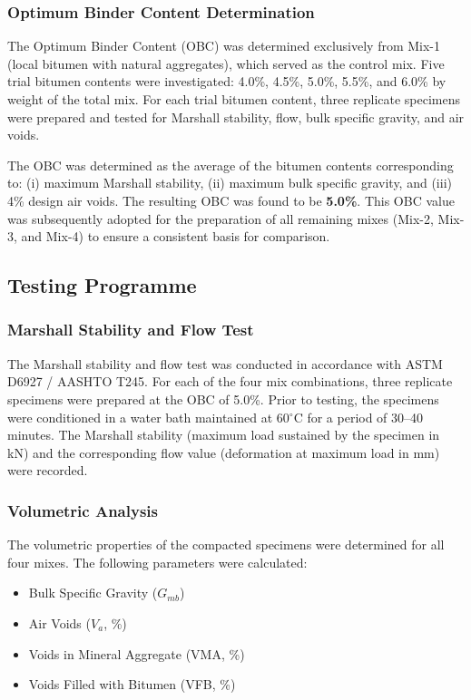 \documentclass[12pt,a4paper]{article}
\begin{document}
\subsubsection{Optimum Binder Content Determination}

The Optimum Binder Content (OBC) was determined exclusively from Mix-1 (local bitumen with natural aggregates), which served as the control mix. Five trial bitumen contents were investigated: 4.0\%, 4.5\%, 5.0\%, 5.5\%, and 6.0\% by weight of the total mix. For each trial bitumen content, three replicate specimens were prepared and tested for Marshall stability, flow, bulk specific gravity, and air voids.

The OBC was determined as the average of the bitumen contents corresponding to: (i) maximum Marshall stability, (ii) maximum bulk specific gravity, and (iii) 4\% design air voids. The resulting OBC was found to be \textbf{5.0\%}. This OBC value was subsequently adopted for the preparation of all remaining mixes (Mix-2, Mix-3, and Mix-4) to ensure a consistent basis for comparison.

\subsection{Testing Programme}

\subsubsection{Marshall Stability and Flow Test}

The Marshall stability and flow test was conducted in accordance with ASTM D6927 / AASHTO T245. For each of the four mix combinations, three replicate specimens were prepared at the OBC of 5.0\%. Prior to testing, the specimens were conditioned in a water bath maintained at 60$^{\circ}$C for a period of 30--40 minutes. The Marshall stability (maximum load sustained by the specimen in kN) and the corresponding flow value (deformation at maximum load in mm) were recorded.

\subsubsection{Volumetric Analysis}

The volumetric properties of the compacted specimens were determined for all four mixes. The following parameters were calculated:

\begin{itemize}
    \item Bulk Specific Gravity ($G_{mb}$)
    \item Air Voids ($V_a$, \%)
    \item Voids in Mineral Aggregate (VMA, \%)
    \item Voids Filled with Bitumen (VFB, \%)
\end{itemize}
\end{document}
